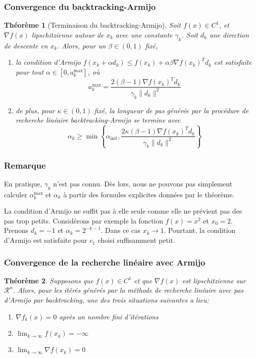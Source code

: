 \documentclass[usepdftitle=false]{beamer}
\newtheorem{thm}{Théorème}
\def\cR{\mathcal{R}}
\begin{document}
\begin{frame}
\frametitle{Convergence du backtracking-Armijo}

\begin{thm}[Terminaison du backtracking-Armijo]
Soit $f(x) \in C^1$, et $\nabla f(x)$ lipschitzienne autour de $x_k$ avec une constante $\gamma_k$.
Soit $d_k$ une direction de descente en $x_k$.
Alors, pour un $\beta \in (0,1)$ fixé,
\begin{enumerate}
\item
la condition d'Armijo $f(x_k + \alpha d_k) \leq f(x_k) + \alpha \beta \nabla f(x_k)^T d_k$ est satisfaite pour tout $\alpha \in [0, a_k^{\max}]$, où
$$
a_k^{\max} = \frac{2(\beta - 1)\nabla f(x_k)^T d_k}{\gamma_k \| d_k \|^2}
$$
\item
de plus, pour $\kappa \in (0,1)$ fixé, la longueur de pas générée par la procédure de recherche linéaire backtracking-Armijo se termine avec
$$
\alpha_k \geq \min \left\{ \alpha_{\mbox{init}}, \frac{2\kappa(\beta - 1)\nabla f(x_k)^T d_k}{\gamma_k \| d_k \|^2} \right\}
$$
\end{enumerate}

\end{thm}

\end{frame}

\begin{frame}
\frametitle{Remarque}

En pratique, $\gamma_k$ n'est pas connu. Dès lors, nous ne pouvons pas simplement calculer $\alpha_k^{\max}$ et $\alpha_k$ à partir des formules explicites données par le théorème.

\mbox{}

La condition d'Armijo ne suffit pas à elle seule comme elle ne prévient pas des pas trop petits.
Considérons par exemple la fonction $f(x) = x^2$ et $x_{0} = 2$. Prenons $d_k = -1$ et $\alpha_k = 2^{-k-1}$. Dans ce cas $x_{k} \rightarrow 1$. Pourtant, la condition d'Armijo est satisfaite pour $c_1$ choisi suffisamment petit.


\end{frame}

\begin{frame}
\frametitle{Convergence de la recherche linéaire avec Armijo}

\begin{thm}%
Supposons que $f(x) \in C^1$ et que $\nabla f(x)$ est lipschitzienne sur $\cR^n$.
Alors, pour les itérés générés par la méthode de recherche linéaire avec pas d'Armijo par backtracking, une des trois situations suivantes a lieu:
\begin{enumerate}
\item
$
\nabla f_k(x) = 0
$ après un nombre fini d'itérations 
\item
$\lim_{k \rightarrow \infty} f(x_k) = -\infty$
\item
$\lim_{k \rightarrow \infty} \nabla f(x_k) = 0$
\end{enumerate}

\end{thm}

\end{frame}
\end{document}
